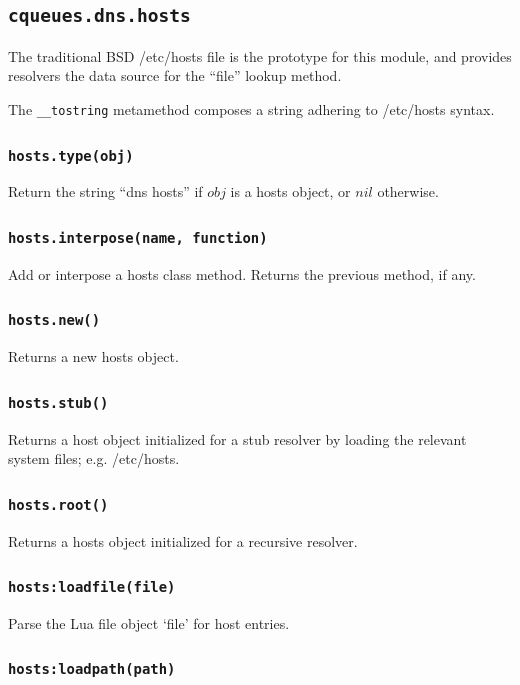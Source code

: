 \documentclass[11pt, oneside]{memoir}
\newcommand*{\routine}[1]{\texttt{#1}\xspace}
\newcommand*{\fn}[1]{\texttt{#1}\xspace}
\newcounter{toccols}
\newenvironment{Module}[1]{
	\subsection{\texttt{#1}}
	\addtocontents{toc}{
		\protect\begin{multicols}{\value{toccols}}
	}
}{
	\addtocontents{toc}{\protect\end{multicols}}
}
\begin{document}
\begin{Module}{cqueues.dns.hosts}

The traditional BSD /etc/hosts file is the prototype for this module, and provides resolvers the data source for the ``file'' lookup method.

The \fn{\_\_tostring} metamethod composes a string adhering to /etc/hosts syntax.

\subsubsection[\routine{hosts.type}]{\routine{hosts.type(obj)}}
Return the string ``dns hosts'' if $obj$ is a hosts object, or $nil$ otherwise.

\subsubsection[\fn{hosts.interpose}]{\fn{hosts.interpose(name, function)}}

Add or interpose a hosts class method. Returns the previous method, if any.

\subsubsection[\fn{hosts.new}]{\fn{hosts.new()}}

Returns a new hosts object.

\subsubsection[\fn{hosts.stub}]{\fn{hosts.stub()}}

Returns a host object initialized for a stub resolver by loading the relevant system files; e.g. /etc/hosts.

\subsubsection[\fn{hosts.root}]{\fn{hosts.root()}}

Returns a hosts object initialized for a recursive resolver.

\subsubsection[\fn{hosts:loadfile}]{\fn{hosts:loadfile(file)}}

Parse the Lua file object `file' for host entries.

\subsubsection[\fn{hosts:loadpath}]{\fn{hosts:loadpath(path)}}


\end{Module}
\end{document}
